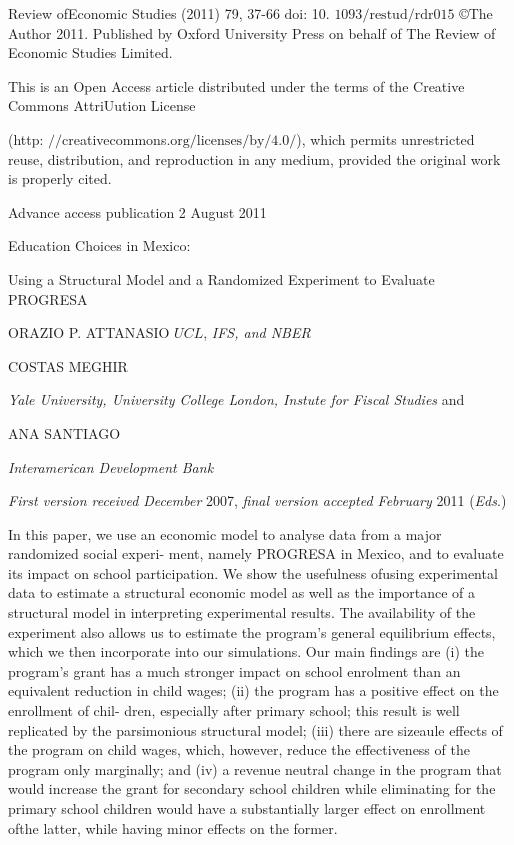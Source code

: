
Review ofEconomic Studies (2011) 79, 37-66 $\mathrm{d}\mathrm{o}\mathrm{i}$: 10. $1093/\mathrm{r}\mathrm{e}\mathrm{s}\mathrm{t}\mathrm{u}\mathrm{d}/\mathrm{r}\mathrm{d}\mathrm{r}015$ \copyright The Author 2011. Published by Oxford University Press on behalf of The Review of Economic Studies Limited.

This is an Open Access article distributed under the terms of the Creative Commons AttriUution License

(http: $//$creativecommons.$\mathrm{o}\mathrm{r}\mathrm{g}/\mathrm{l}\mathrm{i}\mathrm{c}\mathrm{e}\mathrm{n}\mathrm{s}\mathrm{e}\mathrm{s}/\mathrm{b}\mathrm{y}/4.0/$), which permits unrestricted reuse, distribution, and reproduction in any medium, provided the original work is properly cited.

Advance access publication 2 August 2011

Education Choices in Mexico:

Using a Structural Model and a Randomized Experiment to Evaluate PROGRESA

ORAZIO P. ATTANASIO $UCL$, {\it IFS, and NBER}

COSTAS MEGHIR

{\it Yale University, University College London, Instute for Fiscal Studies} and

ANA SANTIAGO

{\it Interamerican Development Bank}

{\it First version received December} 2007, {\it final version accepted February} 2011 ({\it Eds}.)

In this paper, we use an economic model to analyse data from a major randomized social experi- ment, namely PROGRESA in Mexico, and to evaluate its impact on school participation. We show the usefulness ofusing experimental data to estimate a structural economic model as well as the importance of a structural model in interpreting experimental results. The availability of the experiment also allows us to estimate the program's general equilibrium effects, which we then incorporate into our simulations. Our main findings are (i) the program's grant has a much stronger impact on school enrolment than an equivalent reduction in child wages; (ii) the program has a positive effect on the enrollment of chil- dren, especially after primary school; this result is well replicated by the parsimonious structural model; (iii) there are sizeaule effects of the program on child wages, which, however, reduce the effectiveness of the program only marginally; and (iv) a revenue neutral change in the program that would increase the grant for secondary school children while eliminating for the primary school children would have a substantially larger effect on enrollment ofthe latter, while having minor effects on the former.

